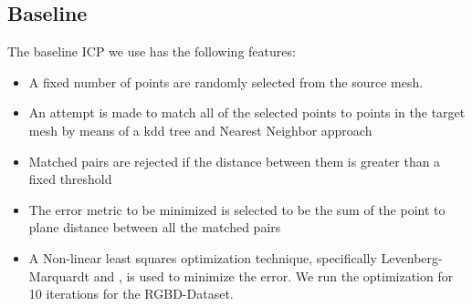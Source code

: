 \documentclass[a4paper,pagesize 10pt]{scrartcl}
\begin{document}
\subsection*{Baseline}
The baseline ICP we use has the following features:
\begin{itemize}
    \item A fixed number of points are randomly selected from the source mesh.
    \item An attempt is made to match all of the selected points to points in the target mesh by means of a kdd tree and Nearest Neighbor approach
    \item Matched pairs are rejected if the distance between them is greater than a fixed threshold
    \item The error metric to be minimized is selected to be the sum of the point to plane distance between all the matched pairs
    \item A Non-linear least squares optimization technique, specifically Levenberg-Marquardt \cite{L} and \cite{M}, is used to minimize the error. We run the optimization for 10 iterations for the RGBD-Dataset.
\end{itemize}
\end{document}
